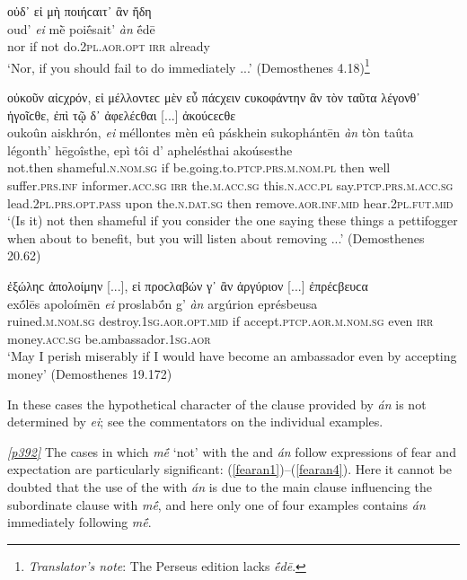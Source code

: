 \begin{exe}
\ex οὐδ᾽ εἰ μὴ ποιήϲαιτ᾽ ἂν ἤδη\\
\gll oud' \emph{ei} mḕ poiḗsait' \emph{àn} ḗdē\\
nor if not do.\textsc{2pl.aor.opt} \textsc{irr} already\\
\trans `Nor, if you should fail to do immediately ...' (Demosthenes 4.18)\footnote{\emph{Translator's note}: The Perseus edition lacks \textit{ḗdē}.}
\label{eian3}
\end{exe}

\begin{exe}
\ex οὐκοῦν αἰϲχρόν, εἰ μέλλοντεϲ μὲν εὖ πάϲχειν ϲυκοφάντην ἂν τὸν ταῦτα λέγονθ᾽ ἡγοῖϲθε, ἐπὶ τῷ δ᾽ ἀφελέϲθαι {[}...{]} ἀκούϲεϲθε\\
\gll oukoûn aiskhrón, \emph{ei} méllontes mèn eû páskhein sukophántēn \emph{àn} tòn taûta légonth' hēgoîsthe, epì tôi d' aphelésthai akoúsesthe\\
not.then shameful.\textsc{n.nom.sg} if be.going.to.\textsc{ptcp.prs.m.nom.pl} then well suffer.\textsc{prs.inf} informer.\textsc{acc.sg} \textsc{irr} the.\textsc{m.acc.sg} this.\textsc{n.acc.pl} say.\textsc{ptcp.prs.m.acc.sg} lead.\textsc{2pl.prs.opt.pass} upon the.\textsc{n.dat.sg} then remove.\textsc{aor.inf.mid} hear.\textsc{2pl.fut.mid}\\
\trans `(Is it) not then shameful if you consider the one saying these things a pettifogger when about to benefit, but you will listen about removing ...' (Demosthenes 20.62)
\label{eian4}
\end{exe}

\begin{exe}
\ex ἐξώληϲ ἀπολοίμην {[}...{]}, εἰ προϲλαβών γ᾽ ἂν ἀργύριον {[}...{]} ἐπρέϲβευϲα\\
\gll exṓlēs apoloímēn \emph{ei} proslabṓn g' \emph{àn} argúrion eprésbeusa\\
ruined.\textsc{m.nom.sg} destroy.\textsc{1sg.aor.opt.mid} if accept.\textsc{ptcp.aor.m.nom.sg} even \textsc{irr} money.\textsc{acc.sg} be.ambassador.\textsc{1sg.aor}\\
\trans `May I perish miserably if I would have become an ambassador even by accepting money' (Demosthenes 19.172)
\label{eian5}
\end{exe}

In these cases the hypothetical character of the clause provided by \emph{án} is not determined by \emph{ei}; see the commentators on the individual examples.

\hyperlink{p392}{\emph{[p392]}} The cases in which \emph{mḗ} `not' with the  and \emph{án} follow expressions of fear and expectation are particularly significant: (\ref{fearan1})--(\ref{fearan4}). Here it cannot be doubted that the use of the  with \emph{án} is due to the main clause influencing the subordinate clause with \emph{mḗ}, and here only one of four examples contains \emph{án} immediately following \emph{mḗ}.

